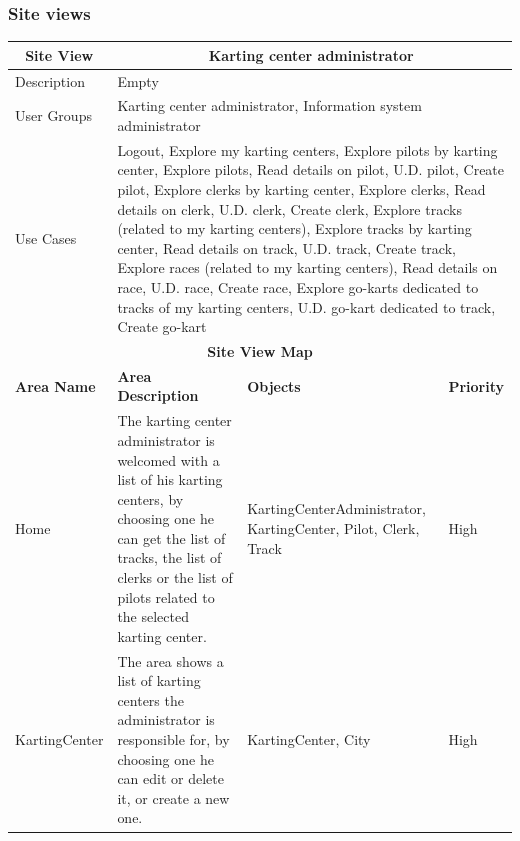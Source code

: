 \documentclass{beamer}
\begin{document}
\begin{frame}
    \frametitle{Site views}
    \begin{table}
        \centering
        \tiny
        \setlength{\tabcolsep}{1pt}
        \begin{tabular}{|m{2cm}|m{4cm}|m{3cm}|m{1cm}|}
        \hline
        \multicolumn{1}{|c|}{\textbf{Site View}} & \multicolumn{3}{c|}{\textbf{Karting center administrator}} \\
        \hline
        Description & \multicolumn{3}{m{8cm}|}{Empty} \\
        \hline
        User Groups & \multicolumn{3}{m{8cm}|}{Karting center administrator, Information system administrator} \\
        \hline
        Use Cases & \multicolumn{3}{m{8cm}|}{Logout, Explore my karting centers, 
        Explore pilots by karting center, Explore pilots, Read details on pilot, U.D. pilot, 
        Create pilot, Explore clerks by karting center, Explore clerks, Read details on clerk, 
        U.D. clerk, Create clerk, Explore tracks (related to my karting centers), 
        Explore tracks by karting center, Read details on track, U.D. track, 
        Create track, Explore races (related to my karting centers), Read details on race, 
        U.D. race, Create race, Explore go-karts dedicated to tracks of my karting centers, 
        U.D. go-kart dedicated to track, Create go-kart} \\
        \hline
        \multicolumn{4}{|c|}{\textbf{Site View Map}} \\
        \hline
        \textbf{Area Name} & \textbf{Area Description} & \textbf{Objects} & \textbf{Priority} \\
        \hline
        Home & The karting center administrator is welcomed with a list of his karting centers,
        by choosing one he can get the list of tracks, the list of clerks or the list of pilots
        related to the selected karting center.
         & KartingCenterAdministrator, KartingCenter, Pilot, Clerk, Track & High \\
        \hline
        KartingCenter & The area shows a list of karting centers the administrator is responsible for,
        by choosing one he can edit or delete it, or create a new one.
         & KartingCenter, City & High \\
        \hline
        \end{tabular}
    \end{table}
\end{frame}
\end{document}

